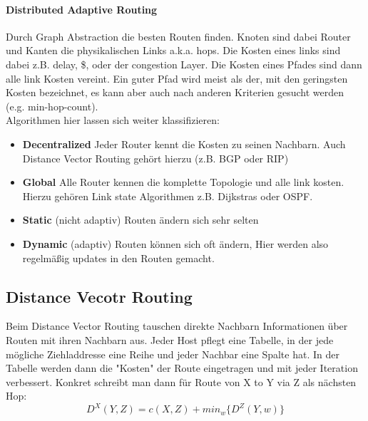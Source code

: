             \paragraph{Distributed Adaptive Routing}
                Durch Graph Abstraction die besten Routen finden. Knoten sind dabei Router und Kanten die physikalischen Links a.k.a. hops. Die Kosten eines links sind dabei z.B. delay, \$, oder der congestion Layer. Die Kosten eines Pfades sind dann alle link Kosten vereint. Ein guter Pfad wird meist als der, mit den geringsten Kosten bezeichnet, es kann aber auch nach anderen Kriterien gesucht werden (e.g. min-hop-count). \\
                Algorithmen hier lassen sich weiter klassifizieren: 
                \begin{itemize}
                    \item \textbf{Decentralized}
                        Jeder Router kennt die Kosten zu seinen Nachbarn. Auch Distance Vector Routing gehört hierzu (z.B. BGP oder RIP)
                    \item \textbf{Global}
                        Alle Router kennen die komplette Topologie und alle link kosten. Hierzu gehören Link state Algorithmen z.B. Dijkstras oder OSPF. 
                    \item \textbf{Static} (nicht adaptiv)
                        Routen ändern sich sehr selten
                    \item \textbf{Dynamic} (adaptiv)
                        Routen können sich oft ändern, Hier werden also regelmäßig updates in den Routen gemacht. 
                \end{itemize}
        
    \subsection{Distance Vecotr Routing}
        Beim Distance Vector Routing tauschen direkte Nachbarn Informationen über Routen mit ihren Nachbarn aus. Jeder Host pflegt eine Tabelle, in der jede mögliche Ziehladdresse eine Reihe und jeder Nachbar eine Spalte hat. In der Tabelle werden dann die "Kosten" der Route eingetragen und mit jeder Iteration verbessert. Konkret schreibt man dann für Route von X to Y via Z als nächsten Hop:
        $$
            D^X(Y,Z) = c(X,Z) + min_w\{D^Z(Y,w)\}
        $$
                
            